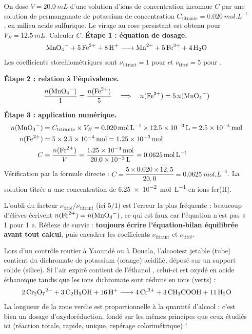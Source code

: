 \documentclass[11pt]{article}
\begin{document}
\begin{exoresolu}
On dose $V = \SI{20,0}{mL}$ d'une solution d'ions  de concentration inconnue $C$ par une solution de permanganate de potassium de concentration $C_{\text{titrante}} = \SI{0,020}{mol.L^{-1}}$, en milieu acide sulfurique. Le virage au rose persistant est obtenu pour $V_E = \SI{12,5}{mL}$. Calculer $C$.
\tcblower
\textbf{Étape 1 : équation de dosage.}
\[ \ce{MnO4- + 5Fe^2+ + 8H+ -> Mn^2+ + 5Fe^3+ + 4H2O} \]
Les coefficients stœchiométriques sont $\nu_{\text{titrant}} = 1$ pour  et $\nu_{\text{titré}} = 5$ pour .

\textbf{Étape 2 : relation à l'équivalence.}
\[ \frac{n(\ce{MnO4-})}{1} = \frac{n(\ce{Fe^2+})}{5} \quad\Longrightarrow\quad n(\ce{Fe^2+}) = 5\,n(\ce{MnO4-}) \]

\textbf{Étape 3 : application numérique.}
\begin{align*}
n(\ce{MnO4-}) &= C_{\text{titrante}} \times V_E = \SI{0,020}{mol.L^{-1}} \times \SI{12,5e-3}{L} = \SI{2,5e-4}{mol}\\
n(\ce{Fe^2+}) &= 5 \times \SI{2,5e-4}{mol} = \SI{1,25e-3}{mol}\\
C &= \frac{n(\ce{Fe^2+})}{V} = \frac{\SI{1,25e-3}{mol}}{\SI{20,0e-3}{L}} = \SI{0,0625}{mol.L^{-1}}
\end{align*}
Vérification par la formule directe : $C = \dfrac{5 \times \num{0,020} \times 12{,}5}{20{,}0} = \SI{0,0625}{mol.L^{-1}}$. La solution titrée a une concentration de \SI{6,25e-2}{mol.L^{-1}} en ions fer(II).
\end{exoresolu}

\begin{attention}
L'oubli du facteur $\nu_{\text{titré}}/\nu_{\text{titrant}}$ (ici $5/1$) est l'erreur la plus fréquente : beaucoup d'élèves écrivent $n(\ce{Fe^2+}) = n(\ce{MnO4-})$, ce qui est faux car l'équation n'est pas « 1 pour 1 ». Réflexe de survie : \textbf{toujours écrire l'équation-bilan équilibrée avant tout calcul}, puis encadrer les coefficients $\nu_{\text{titrant}}$ et $\nu_{\text{titré}}$.
\end{attention}

\begin{savaistu}
Lors d'un contrôle routier à Yaoundé ou à Douala, l'alcootest jetable (tube) contient du dichromate de potassium  (orange) acidifié, déposé sur un support solide (silice). Si l'air expiré contient de l'éthanol , celui-ci est oxydé en acide éthanoïque tandis que les ions dichromate sont réduits en ions  (verts) :
\[ \ce{2Cr2O7^2- + 3C2H5OH + 16H+ -> 4Cr^3+ + 3CH3COOH + 11H2O} \]
La longueur de la zone verdie est proportionnelle à la quantité d'alcool : c'est bien un dosage d'oxydoréduction, fondé sur les mêmes principes que ceux étudiés ici (réaction totale, rapide, unique, repérage colorimétrique) !
\end{savaistu}
\end{document}
